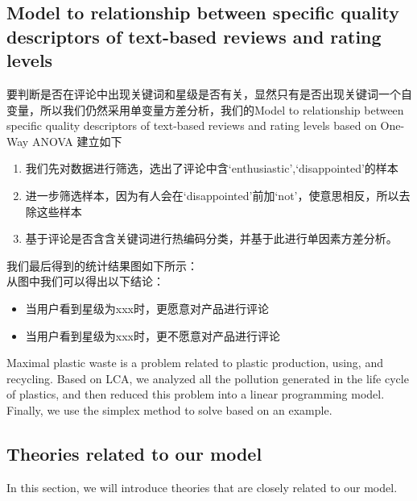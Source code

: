 \documentclass{mcmthesis}
\begin{document}
\subsection{Model to relationship between specific quality descriptors of text-based reviews and rating levels}
要判断是否在评论中出现关键词和星级是否有关，显然只有是否出现关键词一个自变量，所以我们仍然采用单变量方差分析，我们的Model to relationship between specific quality descriptors of text-based reviews and rating levels based on One-Way ANOVA 建立如下\\
\begin{enumerate}
	\item 我们先对数据进行筛选，选出了评论中含‘enthusiastic’,‘disappointed’的样本
	\item 进一步筛选样本，因为有人会在‘disappointed’前加‘not’，使意思相反，所以去除这些样本
	\item 基于评论是否含含关键词进行热编码分类，并基于此进行单因素方差分析。
\end{enumerate}
我们最后得到的统计结果图如下所示：\\

从图中我们可以得出以下结论：
\begin{itemize}
	\item 当用户看到星级为xxx时，更愿意对产品进行评论
	\item 当用户看到星级为xxx时，更不愿意对产品进行评论
\end{itemize}




Maximal plastic waste is a problem related to plastic production, using, and recycling. Based on LCA, we analyzed all the pollution generated in the life cycle of plastics, and then reduced this problem into a linear programming model. Finally, we use the simplex method to solve based on an example.

\subsection{Theories related to our model}

In this section, we will introduce theories that are closely related to our model.

\end{document}
